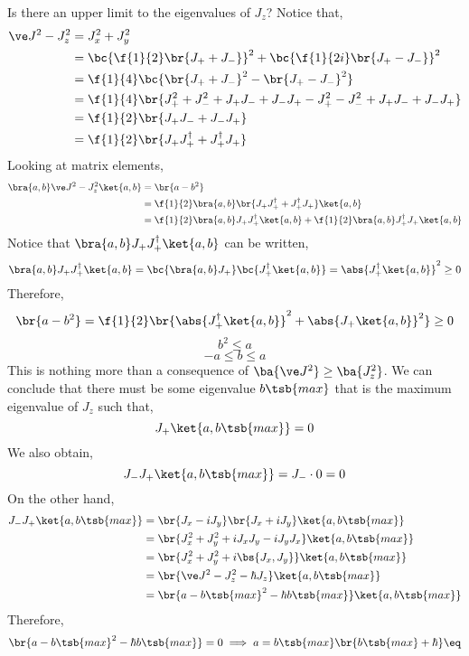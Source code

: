\documentclass{article}
\begin{document}
Is there an upper limit to the eigenvalues of $J_z$? Notice that,
\begin{align*}
\ve J^2 - J_z^2
&= J_x^2 + J_y^2 \\
&= \bc{\f{1}{2} \br{J_+ + J_-}}^2 + \bc{\f{1}{2i} \br{J_+ - J_-}}^2 \\
&= \f{1}{4}\bc{\br{J_+ + J_-}^2 - \br{J_+ - J_-}^2} \\
&= \f{1}{4}\br{J_+^2 + J_-^2 + J_+J_- + J_-J_+ - J_+^2 - J_-^2 + J_+J_- + J_-J_+} \\
&= \f{1}{2}\br{J_+J_- + J_-J_+} \\
&= \f{1}{2}\br{J_+J_+^{\dagger} + J_+^{\dagger}J_+}
\end{align*}
Looking at matrix elements,
\begin{align*}
    \bra{a,b} \ve J^2 - J_z^2 \ket{a,b}
    &= \br{a - b^2} \\
    &= \f{1}{2}\bra{a,b}\br{J_+J_+^{\dagger} + J_+^{\dagger}J_+}\ket{a,b} \\
    &= \f{1}{2}\bra{a,b}J_+J_+^{\dagger}\ket{a,b} + \f{1}{2}\bra{a,b}J_+^{\dagger}J_+\ket{a,b} \\
\end{align*}
Notice that $\bra{a,b}J_+J_+^{\dagger}\ket{a,b}$ can be written,
\[ \bra{a,b}J_+J_+^{\dagger}\ket{a,b} = \bc{\bra{a,b}J_+}\bc{J_+^{\dagger}\ket{a,b}} = \abs{J_+^{\dagger}\ket{a,b}}^2 \geq 0 \]
Therefore,
\[ \br{a - b^2} = \f{1}{2} \br{\abs{J_+^{\dagger}\ket{a,b}}^2 + \abs{J_+\ket{a,b}}^2} \geq 0 \]
\[ b^2 \leq a \]
\[ - a \leq b \leq a \]
This is nothing more than a consequence of $\ba{\ve J^2} \geq \ba{J_z^2}$. We can conclude that there must be some eigenvalue $b\tsb{max}$ that is the maximum eigenvalue of $J_z$ such that,
\[ J_+ \ket{a, b\tsb{max}} = 0 \]
We also obtain,
\[ J_-J_+ \ket{a, b\tsb{max}} = J_- \cdot 0 = 0 \]
On the other hand,
\begin{align*}
    J_-J_+ \ket{a, b\tsb{max}}
    &= \br{J_x - i J_y}\br{J_x + i J_y} \ket{a, b\tsb{max}} \\
    &= \br{J_x^2 + J_y^2 + i J_x J_y- i J_y J_x} \ket{a, b\tsb{max}} \\
    &= \br{J_x^2 + J_y^2 + i \bs{J_x, J_y}} \ket{a, b\tsb{max}} \\
    &= \br{\ve J^2 - J_z^2 - \hbar J_z} \ket{a, b\tsb{max}} \\
    &= \br{a - b\tsb{max}^2 - \hbar b\tsb{max}} \ket{a, b\tsb{max}}
\end{align*}
Therefore,
\[ \br{a - b\tsb{max}^2 - \hbar b\tsb{max}} = 0 \implies a = b\tsb{max}\br{b\tsb{max} + \hbar} \eq \label{eq:bmax}\]
\end{document}
